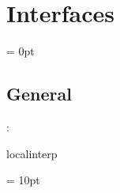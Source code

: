 
\section{Interfaces} 


\parskip = 0pt

\vspace{3mm} \subsection*{General}

: 

localinterp
\vspace{2mm}

\vspace{5mm}\parskip = 10pt 
